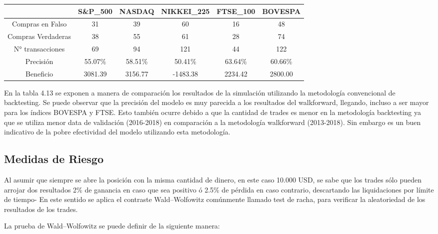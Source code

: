 \documentclass[a4paper,12pt]{Latex/Classes/PhDthesisPSnPDF}
\begin{document}
\begin{center}
\begin{table}[ht]
\centering
\begin{tabular}{cccccc}
  \hline
 & S\&P\_500 & NASDAQ & NIKKEI\_225 & FTSE\_100 & BOVESPA \\ 
  \hline
Compras en Falso & 31 & 39 & 60 & 16 & 48 \\ 
  Compras Verdaderas & 38 & 55 & 61 & 28 & 74 \\ 
  N° transacciones & 69 & 94 & 121 & 44 & 122 \\ 
  Precisión & 55.07\% & 58.51\% & 50.41\% & 63.64\% & 60.66\% \\ 
  Beneficio & 3081.39 & 3156.77 & -1483.38 & 2234.42 & 2800.00 \\ 
   \hline
\end{tabular}
\end{table}\end{center}

En la tabla 4.13 se exponen a manera de comparación los resultados de la simulación utilizando la metodología convencional de backtesting. Se puede observar que la precisión del modelo es muy parecida a los resultados del walkforward, llegando, incluso a ser mayor para los índices BOVESPA y FTSE. Esto también ocurre debido a que la cantidad de trades es menor en la metodología backtesting ya que se utiliza menor data de validación (2016-2018) en comparación a la metodología walkforward (2013-2018). Sin embargo es un buen indicativo de la pobre efectividad del modelo utilizando esta metodología.

\subsection{Medidas de Riesgo}

Al asumir que siempre se abre la posición con la misma cantidad de dinero, en este caso 10.000 USD, se sabe que los trades sólo pueden arrojar dos resultados 2\% de ganancia en caso que sea positivo ó 2.5\% de pérdida en caso contrario, descartando las liquidaciones por límite de tiempo- En este sentido se aplica el contraste Wald–Wolfowitz comúnmente llamado test de racha, para verificar la aleatoriedad de los resultados de los trades.

La prueba de Wald–Wolfowitz se puede definir de la siguiente manera:
\end{document}

